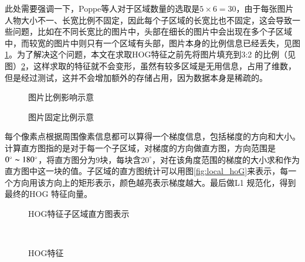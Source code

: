 此处需要强调一下，Poppe等人对于区域数量的选取是$5\times 6=30$，由于每张图片人物大小不一、长宽比例不固定，因此每个子区域的长宽比也不固定，这会导致一些问题，比如在不同长宽比的图片中，头部在细长的图片中会出现在多个子区域中，而较宽的图片中则只有一个区域有头部，图片本身的比例信息已经丢失，见图\ref{fig:broadthin}。为了解决这个问题，本文在求取HOG特征之前先将图片填充到3:2 的比例（见图）\ref{fig:broadthin2}，这样求取的特征就不会变形，虽然有较多区域是无用信息，占用了维数，但是经过测试，这并不会增加额外的存储占用，因为数据本身是稀疏的。
\begin{figure}[htbp]
  \centering
  \hspace{.5cm}
  \caption{图片比例影响示意}\label{fig:broadthin}
\end{figure}

\begin{figure}[htbp]
  \centering
  \hspace{.5cm}
  \caption{图片固定比例示意}\label{fig:broadthin2}
\end{figure}

每个像素点根据周围像素信息都可以算得一个梯度信息，包括梯度的方向和大小。计算直方图指的是对于每一个子区域，对梯度的方向做直方图，方向范围是$0^\circ\thicksim180^\circ$，将直方图分为9块，每块含$20^\circ$，对在该角度范围的梯度的大小求和作为直方图中这一块的值。子区域的直方图统计可以用图\ref{fig:local_hoG}来表示，每一个方向用该方向上的矩形表示，颜色越亮表示梯度越大。最后做L1 规范化，得到最终的HOG 特征向量。
\begin{figure}[htbp]
  \centering
  \hspace{.5cm}
  \hspace{.5cm}
  \caption{HOG特征子区域直方图表示}
\end{figure}

\begin{figure}[htbp]
  \centering
  \hspace{.5cm}
  \hspace{.5cm}
  \\
  \hspace{.5cm}
  \hspace{.5cm}
  \caption{HOG特征}
\end{figure}

